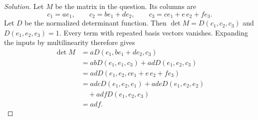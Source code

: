 \begin{proof}[Solution]
Let \(M\) be the matrix in the question. Its columns are
\[
  c_1=ae_1,\qquad c_2=be_1+de_2,\qquad
  c_3=ce_1+e\,e_2+fe_3.
\]
Let \(D\) be the normalized determinant function. Then
\(\det M=D(c_1,c_2,c_3)\) and \(D(e_1,e_2,e_3)=1\).
Every term with repeated basis vectors vanishes. Expanding the inputs by
multilinearity therefore gives
\begin{align*}
  \det M
    &=aD(e_1,be_1+de_2,c_3)\\
    &=abD(e_1,e_1,c_3)+adD(e_1,e_2,c_3)\\
    &=adD(e_1,e_2,ce_1+e\,e_2+fe_3)\\
    &=adcD(e_1,e_2,e_1)+adeD(e_1,e_2,e_2)\\
    &\quad+adfD(e_1,e_2,e_3)\\
    &=adf.
\end{align*}
\end{proof}
